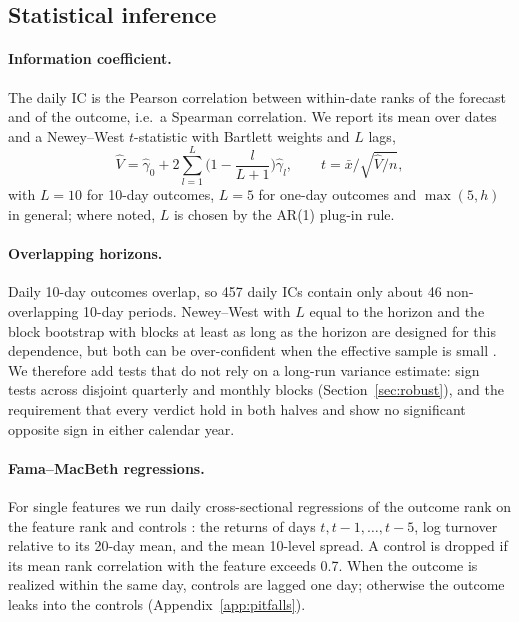 \subsection{Statistical inference}\label{sec:inference}

\paragraph{Information coefficient.} The daily IC is the Pearson correlation between within-date ranks of the forecast and of the outcome, i.e.\ a Spearman correlation. We report its mean over dates and a Newey--West $t$-statistic \citep{newey1987} with Bartlett weights and $L$ lags,
\begin{equation}
\hat V=\hat\gamma_0+2\sum_{l=1}^{L}\Big(1-\frac{l}{L+1}\Big)\hat\gamma_l,\qquad t=\bar x/\sqrt{\hat V/n},
\end{equation}
with $L=10$ for 10-day outcomes, $L=5$ for one-day outcomes and $\max(5,h)$ in general; where noted, $L$ is chosen by the \citet{andrews1991} AR(1) plug-in rule.

\paragraph{Overlapping horizons.} Daily 10-day outcomes overlap, so 457 daily ICs contain only about 46 non-overlapping 10-day periods. Newey--West with $L$ equal to the horizon and the block bootstrap with blocks at least as long as the horizon are designed for this dependence, but both can be over-confident when the effective sample is small \citep{hjalmarsson2011,boudoukh2019}. We therefore add tests that do not rely on a long-run variance estimate: sign tests across disjoint quarterly and monthly blocks (Section~\ref{sec:robust}), and the requirement that every verdict hold in both halves and show no significant opposite sign in either calendar year.

\paragraph{Fama--MacBeth regressions.} For single features we run daily cross-sectional regressions of the outcome rank on the feature rank and controls \citep{fama1973}: the returns of days $t,t-1,\dots,t-5$, log turnover relative to its 20-day mean, and the mean 10-level spread. A control is dropped if its mean rank correlation with the feature exceeds 0.7. When the outcome is realized within the same day, controls are lagged one day; otherwise the outcome leaks into the controls (Appendix~\ref{app:pitfalls}).

